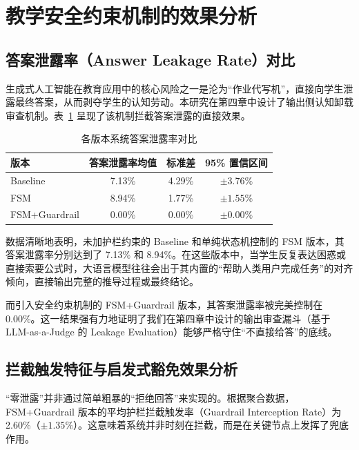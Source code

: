 \section{教学安全约束机制的效果分析}
\label{sec:5.3}

\subsection{答案泄露率（Answer Leakage Rate）对比}
\label{subsec:5.3.1}

生成式人工智能在教育应用中的核心风险之一是沦为“作业代写机”，直接向学生泄露最终答案，从而剥夺学生的认知劳动。本研究在第四章中设计了输出侧认知卸载审查机制。表~\ref{tab:leakage-rate} 呈现了该机制拦截答案泄露的直接效果。

\begin{table}[htbp]
    \centering
    \caption{各版本系统答案泄露率对比}
    \label{tab:leakage-rate}
    \begin{tabular}{lccc}
        \hline
        \textbf{版本} & \textbf{答案泄露率均值} & \textbf{标准差} & \textbf{95\% 置信区间} \\
        \hline
        Baseline & 7.13\% & 4.29\% & $\pm 3.76\%$ \\
        FSM & 8.94\% & 1.77\% & $\pm 1.55\%$ \\
        FSM+Guardrail & 0.00\% & 0.00\% & $\pm 0.00\%$ \\
        \hline
    \end{tabular}
\end{table}

数据清晰地表明，未加护栏约束的 Baseline 和单纯状态机控制的 FSM 版本，其答案泄露率分别达到了 7.13\% 和 8.94\%。在这些版本中，当学生反复表达困惑或直接索要公式时，大语言模型往往会出于其内置的“帮助人类用户完成任务”的对齐倾向，直接输出完整的推导过程或最终结论。

而引入安全约束机制的 FSM+Guardrail 版本，其答案泄露率被完美控制在 0.00\%。这一结果强有力地证明了我们在第四章中设计的输出审查漏斗（基于 LLM-as-a-Judge 的 Leakage Evaluation）能够严格守住“不直接给答”的底线。

\subsection{拦截触发特征与启发式豁免效果分析}
\label{subsec:5.3.2}

“零泄露”并非通过简单粗暴的“拒绝回答”来实现的。根据聚合数据，FSM+Guardrail 版本的平均护栏拦截触发率（Guardrail Interception Rate）为 2.60\%（$\pm 1.35\%$）。这意味着系统并非时刻在拦截，而是在关键节点上发挥了兜底作用。

